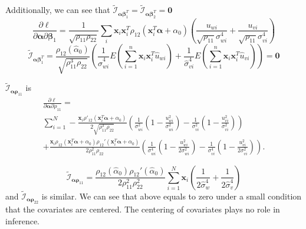 \documentclass[aap,authoryear, preprint]{imsart}
\numberwithin{equation}{section}
\theoremstyle{plain}
\begin{document}
Additionally, we can see that $\tilde{\mathcal{I}}_{\bm{\alpha}{\bm{\beta}_1^T}} =  \tilde{\mathcal{I}}_{\bm{\alpha}{\bm{\beta}_2^T}} = \bm{0}$
\begin{equation}
\frac{\partial \ell}{\partial \bm{\alpha} \partial\bm{\beta}_1}= 
    \frac{1}{\sqrt{\rho_{11}\rho_{22}}} \sum_i \bm{x}_i \bm{x}_i^T \rho_{12}(\bm{x}_i^T\bm{\alpha} + \alpha_0) \left( 
    \frac{u_{wi}}{\sqrt{\rho_{11}}\sigma_{wi}^4} + \frac{u_{vi}}{\sqrt{\rho_{11}}\sigma_{vi}^4}
    \right)
\end{equation}
$$
\tilde{\mathcal{I}}_{\bm{\alpha}{\bm{\beta}_1^T}} = 
\frac{\rho_{12}(\hat{\alpha}_0)}{\sqrt{\rho_{11}^3\rho_{22}}} \left(
\frac{1}{\hat{\sigma}_{wi}^4}
E\left( \sum_{i=1}^{n} \bm{x}_i \bm{x}_i^T \hat{u}_{wi}\right)
+\frac{1}{\hat{\sigma}_{vi}^4}
E\left( \sum_{i=1}^{n} \bm{x}_i \bm{x}_i^T \hat{u}_{vi} \right)
\right) = \bm{0}$$

\noindent $\tilde{\mathcal{I}}_{\bm{\alpha}\bm{\rho}_{11}}$ is
\begin{equation}
    \begin{multlined}
    \frac{\partial \ell}{\partial \bm{\alpha}\partial\rho_{11}} = \\
     \sum_{i=1}^{N} -\frac{\bm{x}_i \rho'_{12}(\bm{x}_i^T \bm{\alpha}+\alpha_0)}{2\sqrt{\rho_{11}^3\rho_{22}}} \left( \frac{1}{\sigma_{wi}^2}\left( 1-\frac{u_{wi}^2}{\sigma_{wi}^2} \right) - 
     \frac{1}{\sigma_{vi}^2} \left( 1-\frac{u_{vi}^2}{\sigma_{vi}^2}\right) \right)\\
     + \frac{\bm{x}_i \rho_{12}(\bm{x}_i^T\bm{\alpha} + \alpha_0) \rho_{12}'(\bm{x}_i^T \bm{\alpha} + \alpha_0)}{2\rho_{11}^2 \rho_{22}}\left( \frac{1}{\sigma_{wi}^4}\left( 1-\frac{u_{wi}^2}{2\sigma_{wi}^2} \right) - 
     \frac{1}{\sigma_{vi}^4} \left( 1-\frac{u_{vi}^2}{2\sigma_{vi}^2}\right) \right).
    \end{multlined}
\end{equation}

\begin{equation*}
\tilde{\mathcal{I}}_{\bm{\alpha}\bm{\rho}_{11}} = \frac{\rho_{12}(\hat{\alpha}_0)\rho_{12}'(\hat{\alpha}_0)}{2\rho_{11}^2 \rho_{22}^2} \sum_{i=1}^{N} \bm{x}_i \left( \frac{1}{2\hat{\sigma}_w^4} + \frac{1}{2\hat{\sigma}_v^4}\right)
\end{equation*}
and $\tilde{\mathcal{I}}_{\bm{\alpha}\bm{\rho}_{22}}$ is similar. We can see that above equals to zero under a small condition that the covariates are centered. The centering of covariates plays no role in inference. \\
\end{document}
